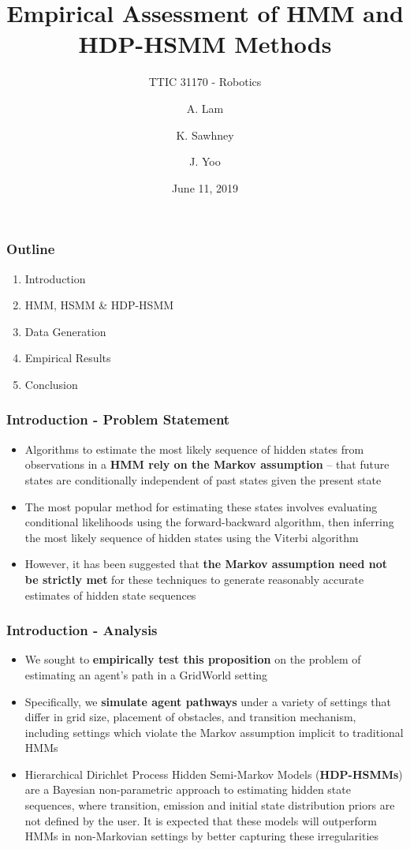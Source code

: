 \documentclass{beamer}
\title[]{Empirical Assessment of HMM and HDP-HSMM Methods}
\subtitle{TTIC 31170 - Robotics}
\author[Lam, Sawhney, Yoo]{A. Lam \and K. Sawhney \and J. Yoo}
\date[June 11, 2019]{June 11, 2019}
\begin{document}
\frame{\titlepage}

\begin{frame}
\frametitle{Outline}
    \begin{enumerate}[I]
        \item Introduction
        \item HMM, HSMM \& HDP-HSMM
        \item Data Generation
        \item Empirical Results
        \item Conclusion
    \end{enumerate}
\end{frame}


\begin{frame}
\frametitle{Introduction - Problem Statement}
    \begin{itemize}
        \item Algorithms to estimate the most likely sequence of hidden states from observations in a \textbf{HMM rely on the Markov assumption} -- that future states are conditionally independent of past states given the present state
        \item The most popular method for estimating these states involves evaluating conditional likelihoods using the forward-backward algorithm, then inferring the most likely sequence of hidden states using the Viterbi algorithm
        \item However, it has been suggested that \textbf{the Markov assumption need not be strictly met} for these techniques to generate reasonably accurate estimates of hidden state sequences
    \end{itemize}
\end{frame}

\begin{frame}
    \frametitle{Introduction - Analysis}
        \begin{itemize}
            \item We sought to \textbf{empirically test this proposition} on the problem of estimating an agent's path in a GridWorld setting
            \item Specifically, we \textbf{simulate agent pathways} under a variety of settings that differ in grid size, placement of obstacles, and transition mechanism, including settings which violate the Markov assumption implicit to traditional HMMs
            \item Hierarchical Dirichlet Process Hidden Semi-Markov Models (\textbf{HDP-HSMMs}) are a Bayesian non-parametric approach to estimating hidden state sequences, where transition, emission and initial state distribution priors are not defined by the user. It is expected that these models will outperform HMMs in non-Markovian settings by better capturing these irregularities
        \end{itemize}
    \end{frame}
\end{document}
